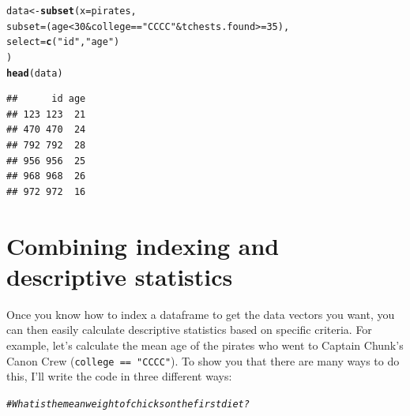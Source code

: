 \documentclass{tufte-book}\usepackage[]{graphicx}\usepackage[]{color}
\makeatletter
\newcommand{\hlnum}[1]{\textcolor[rgb]{0.686,0.059,0.569}{#1}}%
\newcommand{\hlstr}[1]{\textcolor[rgb]{0.192,0.494,0.8}{#1}}%
\newcommand{\hlcom}[1]{\textcolor[rgb]{0.678,0.584,0.686}{\textit{#1}}}%
\newcommand{\hlopt}[1]{\textcolor[rgb]{0,0,0}{#1}}%
\newcommand{\hlstd}[1]{\textcolor[rgb]{0.345,0.345,0.345}{#1}}%
\newcommand{\hlkwb}[1]{\textcolor[rgb]{0.69,0.353,0.396}{#1}}%
\newcommand{\hlkwc}[1]{\textcolor[rgb]{0.333,0.667,0.333}{#1}}%
\newcommand{\hlkwd}[1]{\textcolor[rgb]{0.737,0.353,0.396}{\textbf{#1}}}%
\newenvironment{kframe}{%
 \def\at@end@of@kframe{}%
 \ifinner\ifhmode%
  \def\at@end@of@kframe{\end{minipage}}%
  \begin{minipage}{\columnwidth}%
 \fi\fi%
 \def\FrameCommand##1{\hskip\@totalleftmargin \hskip-\fboxsep
 \colorbox{shadecolor}{##1}\hskip-\fboxsep
     \hskip-\linewidth \hskip-\@totalleftmargin \hskip\columnwidth}%
 \MakeFramed {\advance\hsize-\width
   \@totalleftmargin\z@ \linewidth\hsize
   \@setminipage}}%
 {\par\unskip\endMakeFramed%
 \at@end@of@kframe}
\newenvironment{knitrout}{}{} %
\makeatother
\begin{document}
\begin{footnotesize}
 \begin{footnotesize}
\begin{knitrout}
\color{fgcolor}\begin{kframe}
\begin{alltt}
\hlstd{data} \hlkwb{<-} \hlkwd{subset}\hlstd{(}\hlkwc{x} \hlstd{= pirates,}
               \hlkwc{subset} \hlstd{= (age} \hlopt{<} \hlnum{30} \hlopt{&} \hlstd{college} \hlopt{==} \hlstr{"CCCC"} \hlopt{&} \hlstd{tchests.found} \hlopt{>=} \hlnum{35}\hlstd{),}
               \hlkwc{select} \hlstd{=} \hlkwd{c}\hlstd{(}\hlstr{"id"}\hlstd{,} \hlstr{"age"}\hlstd{)}
               \hlstd{)}
\hlkwd{head}\hlstd{(data)}
\end{alltt}
\begin{verbatim}
##      id age
## 123 123  21
## 470 470  24
## 792 792  28
## 956 956  25
## 968 968  26
## 972 972  16
\end{verbatim}
\end{kframe}
\end{knitrout}
\end{footnotesize}
 
\section{Combining indexing and descriptive statistics}

Once you know how to index a dataframe to get the data vectors you want, you can then easily calculate descriptive statistics based on specific criteria. For example, let's calculate the mean age of the pirates who went to Captain Chunk's Canon Crew (\texttt{college == "CCCC"}). To show you that there are many ways to do this, I'll write the code in three different ways:

\begin{footnotesize}
\begin{knitrout}
\color{fgcolor}\begin{kframe}
\begin{alltt}
\hlcom{# What is the mean weight of chicks on the first diet?}


\end{alltt}
\end{kframe}
\end{knitrout}
\end{footnotesize}
\end{footnotesize}
\end{document}
